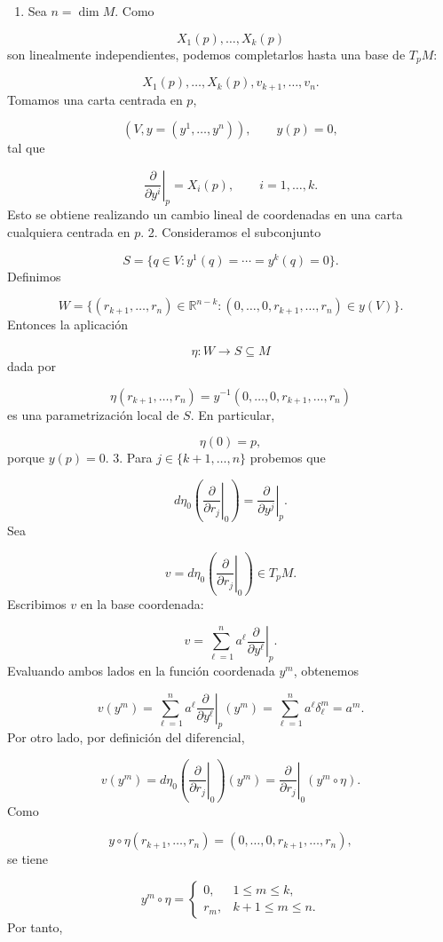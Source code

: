 \begin{bookproof}{}
\begin{enumerate}
\item Sea $n=\dim M$. Como
\end{enumerate}
\[
X_1(p),\ldots,X_k(p)
\]
son linealmente independientes, podemos completarlos hasta una base de $T_pM$:

\[
X_1(p),\ldots,X_k(p),v_{k+1},\ldots,v_n.
\]
Tomamos una carta centrada en $p$,

\[
(V,y=(y^1,\ldots,y^n)),\qquad y(p)=0,
\]
tal que

\[
\left.\frac{\partial}{\partial y^i}\right|_p=X_i(p),\qquad i=1,\ldots,k.
\]
Esto se obtiene realizando un cambio lineal de coordenadas en una carta cualquiera centrada en $p$. 2. Consideramos el subconjunto

\[
S=\{q\in V:y^1(q)=\cdots=y^k(q)=0\}.
\]
Definimos

\[
W=\{(r_{k+1},\ldots,r_n)\in\mathbb R^{n-k}:(0,\ldots,0,r_{k+1},\ldots,r_n)\in y(V)\}.
\]
Entonces la aplicación

\[
\eta:W\longrightarrow S\subseteq M
\]
dada por

\[
\eta(r_{k+1},\ldots,r_n)=y^{-1}(0,\ldots,0,r_{k+1},\ldots,r_n)
\]
es una parametrización local de $S$. En particular,

\[
\eta(0)=p,
\]
porque $y(p)=0$. 3. Para $j\in\{k+1,\ldots,n\}$ probemos que

\[
d\eta_0\left(\left.\frac{\partial}{\partial r_j}\right|_0\right)=\left.\frac{\partial}{\partial y^j}\right|_p.
\]
Sea

\[
v=d\eta_0\left(\left.\frac{\partial}{\partial r_j}\right|_0\right)\in T_pM.
\]
Escribimos $v$ en la base coordenada:

\[
v=\sum_{\ell=1}^n a^\ell\left.\frac{\partial}{\partial y^\ell}\right|_p.
\]
Evaluando ambos lados en la función coordenada $y^m$, obtenemos

\[
v(y^m)=\sum_{\ell=1}^n a^\ell\left.\frac{\partial}{\partial y^\ell}\right|_p(y^m)=\sum_{\ell=1}^n a^\ell\delta_\ell^m=a^m.
\]
Por otro lado, por definición del diferencial,

\[
v(y^m)=d\eta_0\left(\left.\frac{\partial}{\partial r_j}\right|_0\right)(y^m)=\left.\frac{\partial}{\partial r_j}\right|_0(y^m\circ\eta).
\]
Como

\[
y\circ\eta(r_{k+1},\ldots,r_n)=(0,\ldots,0,r_{k+1},\ldots,r_n),
\]
se tiene

\[
y^m\circ\eta=\begin{cases}0,&1\leq m\leq k,\\r_m,&k+1\leq m\leq n.\end{cases}
\]
Por tanto,


\end{bookproof}
